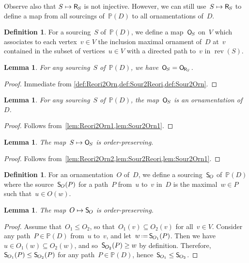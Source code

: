 \documentclass{amsart}
\newtheorem{lemma}[theorem]{Lemma}
\theoremstyle{definition}
\newtheorem{definition}[theorem]{Definition}
\newcommand{\eqdef}{\mbox{\,\raisebox{0.2ex}{\scriptsize\ensuremath{\mathrm:}}\ensuremath{=}\,}} %
\newcommand{\mymap}[2]{\mathsf{#1}_{\hspace{-.7pt}#2}}
\newcommand{\orn}[1]{\mymap{O}{#1}}  %
\newcommand{\reori}[1]{\mymap{R}{#1}}  %
\DeclareMathOperator{\rev}{rev} %
\newcommand{\sour}[1]{\mymap{S}{#1}}  %
\newcommand{\PP}{\mathbb P} %
\begin{document}
Observe also that $S \mapsto \reori{S}$ is not injective.
However, we can still use~$S \mapsto \reori{S}$ to define a map from all sourcings of~$\PP(D)$ to all ornamentations of~$D$.

\begin{definition}
\label{def:Sour2Orn}
For a sourcing~$S$ of~$\PP(D)$, we define a map~$\orn{S}$ on~$V$ which associates to each vertex~$v \in V$ the inclusion maximal ornament of~$D$ at~$v$ contained in the subset of vertices~$u \in V$ with a directed path to~$v$ in $\rev(S)$.
\end{definition}

\begin{lemma}
\label{lem:Sour2Orn1}
For any sourcing~$S$ of~$\PP(D)$, we have~$\orn{S} = \orn{\reori{S}}$.
\end{lemma}

\begin{proof}
Immediate from \cref{def:Reori2Orn,def:Sour2Reori,def:Sour2Orn}.
\end{proof}

\begin{lemma}
\label{lem:Sour2Orn2}
For any sourcing~$S$ of~$\PP(D)$, the map~$\orn{S}$ is an ornamentation of~$D$.
\end{lemma}

\begin{proof}
Follows from~\cref{lem:Reori2Orn1,lem:Sour2Orn1}.
\end{proof}

\begin{lemma}
\label{lem:Sour2Orn3}
The map~$S \mapsto \orn{S}$ is order-preserving.
\end{lemma}

\begin{proof}
Follows from~\cref{lem:Reori2Orn2,lem:Sour2Reori,lem:Sour2Orn1}.
\end{proof}

\begin{definition}
\label{def:Orn2Sour}
For an ornamentation~$O$ of~$D$, we define a sourcing~$\sour{O}$ of~$\PP(D)$ where the source~$\sour{O}(P)$ for a path~$P$ from~$u$ to~$v$ in~$D$ is the maximal~$w \in P$ such that~$u \in O(w)$.
\end{definition}

\begin{lemma}
\label{lem:Orn2Sour1}
The map~$O \mapsto \sour{O}$ is order-preserving.
\end{lemma}

\begin{proof}
Assume that~$O_1 \le O_2$, so that~$O_1(v) \subseteq O_2(v)$ for all~$v \in V$.
Consider any path~$P \in \PP(D)$ from~$u$ to~$v$, and let~$w \eqdef \sour{O_1}(P)$.
Then we have~$u \in O_1(w) \subseteq O_2(w)$, and so~$\sour{O_2}(P) \ge w$ by definition.
Therefore, $\sour{O_1}(P) \le \sour{O_2}(P)$ for any path~$P \in \PP(D)$, hence~${\sour{O_1} \le \sour{O_2}}$.
\end{proof}
\end{document}

